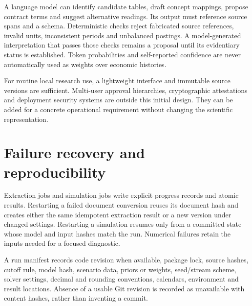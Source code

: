 A language model can identify candidate tables, draft concept mappings,
propose contract terms and suggest alternative readings. Its output must
reference source spans and a schema. Deterministic checks reject fabricated
source references, invalid units, inconsistent periods and unbalanced
postings. A model-generated interpretation that passes those checks remains
a proposal until its evidentiary status is established. Token probabilities
and self-reported confidence are never automatically used as weights over
economic histories.

For routine local research use, a lightweight interface and immutable source
versions are sufficient. Multi-user approval hierarchies, cryptographic
attestations and deployment security systems are outside this initial design.
They can be added for a concrete operational requirement without changing the
scientific representation.

\section{Failure recovery and reproducibility}

Extraction jobs and simulation jobs write explicit progress records and atomic
results. Restarting a failed document conversion reuses its document hash and
creates either the same idempotent extraction result or a new version under
changed settings. Restarting a simulation resumes only from a committed state
whose model and input hashes match the run. Numerical failures retain the
inputs needed for a focused diagnostic.

A run manifest records code revision when available, package lock, source
hashes, cutoff rule, model hash, scenario data, priors or weights, seed/stream
scheme, solver settings, decimal and rounding conventions, calendars,
environment and result locations. Absence of a usable Git revision is recorded
as unavailable with content hashes, rather than inventing a commit.
